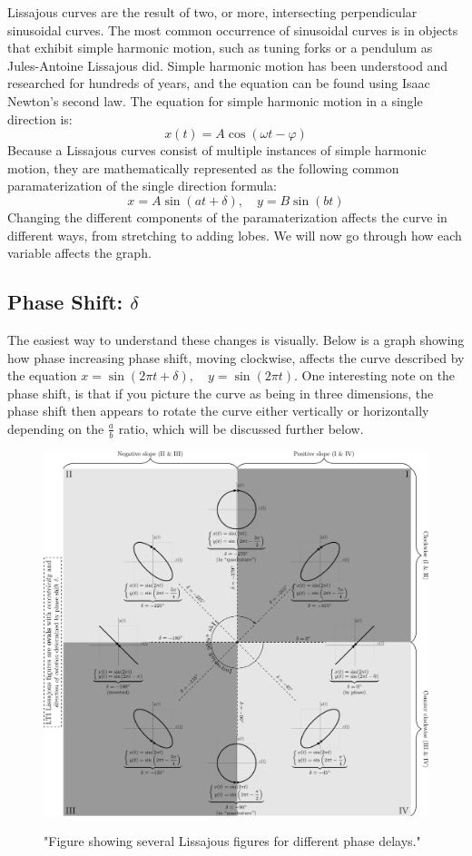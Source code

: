 Lissajous curves are the result of two, or more, intersecting perpendicular sinusoidal curves. The most common occurrence of sinusoidal curves is in objects that exhibit simple harmonic motion, such as tuning forks or a pendulum as Jules-Antoine Lissajous did. Simple harmonic motion has been understood and researched for hundreds of years, and the equation can be found using Isaac Newton's second law. The equation for simple harmonic motion in a single direction is: \[x(t)=A \cos (\omega t-\varphi)\] Because a Lissajous curves consist of multiple instances of simple harmonic motion, they are mathematically represented as the following common paramaterization of the single direction formula: \[x=A \sin (a t+\delta), \quad y=B \sin (b t)\]
Changing the different components of the paramaterization affects the curve in different ways, from stretching to adding lobes. We will now go through how each variable affects the graph.

\subsection{Phase Shift: $\delta$}
The easiest way to understand these changes is visually. Below is a graph showing how phase increasing phase shift, moving clockwise, affects the curve described by the equation $x = \sin(2\pi t + \delta), \quad y = \sin(2\pi t)$. One interesting note on the phase shift, is that if you picture the curve as being in three dimensions, the phase shift then appears to rotate the curve either vertically or horizontally depending on the $\frac{a}{b}$ ratio, which will be discussed further below.
\begin{figure}[h]
    \centering
    \includegraphics[scale=0.2]{Images/PhaseShift.png}
    \cite{PhaseShift}
    \caption{"Figure showing several Lissajous figures for different phase delays."}
    \label{fig:my_label}
\end{figure}
\newpage
